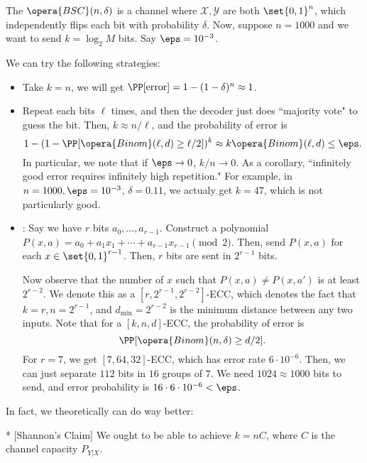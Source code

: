 \begin{exm}
	The  $\opera{BSC}(n,\delta)$ is a channel where $\mathcal X, \mathcal Y$ are both $\set{0,1}^n$, which independently flips each bit with probability $\delta$.
	Now, suppose $n = 1000$ and we want to send $k = \log_2 M$ bits. Say $\eps = 10^{-3}$.

	We can try the following strategies:
	\begin{itemize}
		\item Take $k = n$, we will get $\PP[\text{error}] = 1 - (1-\delta)^n \approx 1$.
		\item Repeat each bits $\ell$ times, and then the decoder just does ``majority vote" to guess the bit.
			Then, $k\approx n/\ell$, and the probability of error is \[
				1 - (1-\PP[\opera{Binom}(\ell,d) \geq \ell/2])^k \approx k\opera{Binom}(\ell,d)\leq \eps.
			\]
			In particular, we note that if $\eps\to 0$, $k/n\to 0$.
			As a corollary, ``infinitely good error requires infinitely high repetition."
			For example, in $n = 1000, \eps = 10^{-3}$, $\delta = 0.11$, we actualy get $k = 47$, which is not particularly good.
		\item {}: Say we have $r$ bits $a_0, \ldots, a_{r-1}$.
			Construct a polynomial $P(x,a) = a_0 + a_1x_1 + \cdots + a_{r-1}x_{r-1}\pmod 2$.
			Then, send $P(x,a)$ for each $x \in \set{0,1}^{r-1}$.
			Then, $r$ bits are sent in $2^{r-1}$ bits.
			
			Now observe that the number of $x$ such that $P(x,a) \neq P(x,a')$ is at least $2^{r-2}$. We denote this as a $[r,2^{r-1}, 2^{r-2}]$-ECC, which denotes the fact that $k = r, n = 2^{r-1}$, and $d_{\text{min}} = 2^{r-2}$ is the minimum distance between any two inputs.
			Note that for a $[k,n,d]$-ECC, the probability of error is \[
				\PP[\opera{Binom}(n,\delta) \geq d/2].
			\]
			For $r = 7$, we get $[7, 64, 32]$-ECC, which has error rate $6\cdot 10^{-6}$. Then, we can just separate $112$ bits in $16$ groups of $7$. 
			We need $1024 \approx 1000$ bits to send, and error probability is $16\cdot 6\cdot 10^{-6} < \eps$.
	\end{itemize}
\end{exm}

In fact, we theoretically can do way better:

\begin{fact}*
	[Shannon's Claim]
	We ought to be able to achieve $k = nC$, where $C$ is the channel capacity $P_{Y|X}$.
\end{fact}

